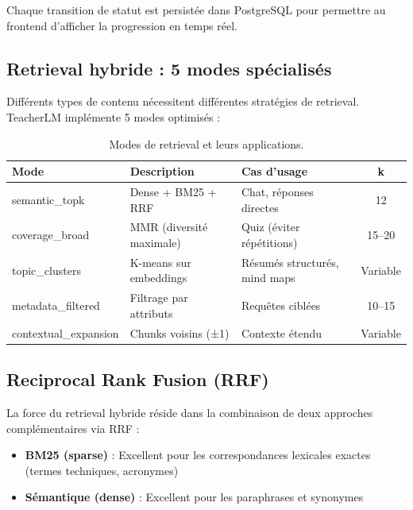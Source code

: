 \documentclass[12pt,a4paper]{article}
\begin{document}
Chaque transition de statut est persistée dans PostgreSQL pour permettre au frontend d'afficher la progression en temps réel.

\subsection{Retrieval hybride : 5 modes spécialisés}

Différents types de contenu nécessitent différentes stratégies de retrieval. TeacherLM implémente 5 modes optimisés :

\begin{table}[H]
    \centering
    \small
    \begin{tabularx}{\textwidth}{@{}lXlc@{}}
        \toprule
        \textbf{Mode} & \textbf{Description} & \textbf{Cas d'usage} & \textbf{k} \\
        \midrule
        semantic\_topk & Dense + BM25 + RRF & Chat, réponses directes & 12 \\
        \addlinespace
        coverage\_broad & MMR (diversité maximale) & Quiz (éviter répétitions) & 15--20 \\
        \addlinespace
        topic\_clusters & K-means sur embeddings & Résumés structurés, mind maps & Variable \\
        \addlinespace
        metadata\_filtered & Filtrage par attributs & Requêtes ciblées & 10--15 \\
        \addlinespace
        contextual\_expansion & Chunks voisins (±1) & Contexte étendu & Variable \\
        \bottomrule
    \end{tabularx}
    \caption{Modes de retrieval et leurs applications.}
\end{table}

\subsection{Reciprocal Rank Fusion (RRF)}

La force du retrieval hybride réside dans la combinaison de deux approches complémentaires via RRF :

\begin{itemize}
    \item \textbf{BM25 (sparse)} : Excellent pour les correspondances lexicales exactes (termes techniques, acronymes)
    \item \textbf{Sémantique (dense)} : Excellent pour les paraphrases et synonymes
\end{itemize}
\end{document}
